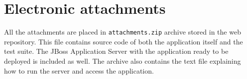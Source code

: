 \documentclass[12pt,oneside,final]{fithesis2}
\begin{document}
\printbibliography

\appendix

\chapter{Electronic attachments}
All the attachments are placed in \verb|attachments.zip| archive stored in the web repository\footnotemark{}.
This file contains source code of both the application itself and the test suite.
The JBoss Application Server with the application ready to be deployed is included as well.
The archive also contains the text file explaining how to run the server and access the application.
\end{document}
